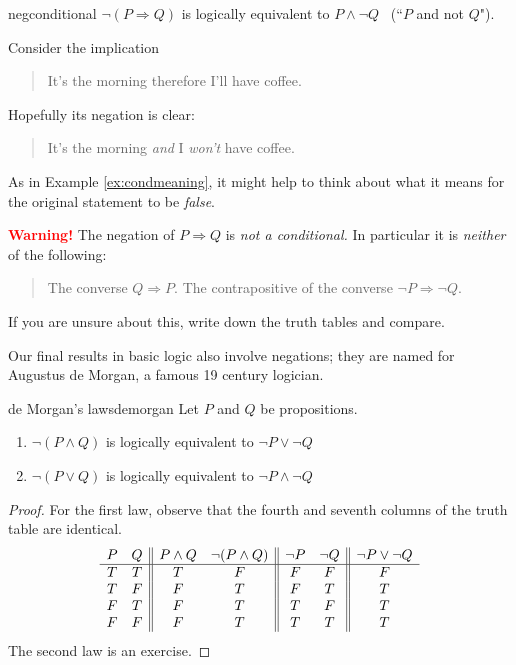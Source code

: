 \begin{thm}{}{negconditional}
	$\neg(P\Longrightarrow Q)$ is logically equivalent to $P\wedge\neg Q$ \ (``$P$ and not $Q$").
\end{thm}

\vspace{-5pt}

\goodbreak

\begin{example}{}{}
	Consider the implication
	\begin{quote}
	  It's the morning therefore I'll have coffee.
	\end{quote}
	Hopefully its negation is clear:
	\begin{quote}
	  It's the morning \emph{and} I \emph{won't} have coffee.
	\end{quote}
	As in Example \ref{ex:condmeaning}, it might help to think about what it means for the original statement to be \emph{false}.
\end{example}

\begin{tcolorbox}
{\bf \textcolor{red}{Warning!}} The negation of $P\Longrightarrow Q$ is \emph{not a conditional.} In particular it is \emph{neither} of the following:
\begin{quote}
  The converse $Q\Longrightarrow P$.\smallbreak
  The contrapositive of the converse $\neg P\Longrightarrow\neg Q$. 
\end{quote}
If you are unsure about this, write down the truth tables and compare.
\end{tcolorbox}

\bigbreak


Our final results in basic logic also involve negations; they are named for Augustus de Morgan, a famous 19\th{} century logician.

\begin{thm}{de Morgan's laws}{demorgan}
	Let $P$ and $Q$ be propositions.
	\begin{enumerate}\itemsep0pt
	  \item $\neg(P\wedge Q)$ is logically equivalent to $\neg P\vee\neg Q$
	  \item $\neg(P\vee Q)$ is logically equivalent to $\neg P\wedge\neg Q$
	\end{enumerate}
\end{thm}

\begin{proof}
	For the first law, observe that the fourth and seventh columns of the truth table are identical.
	\[
		\begin{array}[t]{cc||cc||cc||c}
			P & Q & P\wedge Q & \neg(P\wedge Q) & \neg P & \neg Q & \neg P\vee\neg Q\\\hline
			T & T & T & F & F & F & F\\
			T & F & F & T & F & T & T\\
			F & T & F & T & T & F & T\\
			F & F & F & T & T & T & T
		\end{array}
	\]
	The second law is an exercise.
\end{proof}

